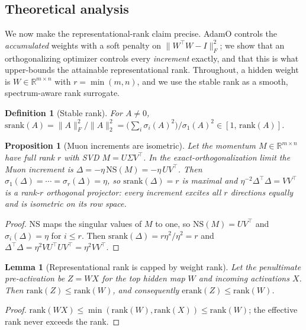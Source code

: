 \documentclass[letterpaper]{article} %
\newtheorem{proposition}{Proposition}
\newtheorem{lemma}{Lemma}
\newtheorem{definition}{Definition}
\begin{document}
\subsection{Theoretical analysis}\label{sec:theory}
We now make the representational-rank claim precise. AdamO controls the \emph{accumulated} weights with a soft penalty on $\|W^\top W-I\|_F^2$; we show that an orthogonalizing optimizer controls every \emph{increment} exactly, and that this is what upper-bounds the attainable representational rank. Throughout, a hidden weight is $W\in\mathbb{R}^{m\times n}$ with $r=\min(m,n)$, and we use the stable rank as a smooth, spectrum-aware rank surrogate.

\begin{definition}[Stable rank]
For $A\neq 0$, $\mathrm{srank}(A)=\|A\|_F^2/\|A\|_2^2=\big(\sum_i\sigma_i(A)^2\big)/\sigma_1(A)^2\in[1,\,\mathrm{rank}(A)]$.
\end{definition}

\begin{proposition}[Muon increments are isometric]\label{prop:iso}
Let the momentum $M\in\mathbb{R}^{m\times n}$ have full rank $r$ with SVD $M=U\Sigma V^\top$. In the exact-orthogonalization limit the Muon increment is $\Delta=-\eta\,\mathrm{NS}(M)=-\eta\,UV^\top$. Then $\sigma_1(\Delta)=\cdots=\sigma_r(\Delta)=\eta$, so $\mathrm{srank}(\Delta)=r$ is maximal and $\eta^{-2}\Delta^\top\Delta=VV^\top$ is a rank-$r$ orthogonal projector: every increment excites all $r$ directions equally and is isometric on its row space.
\end{proposition}
\begin{proof}
$\mathrm{NS}$ maps the singular values of $M$ to one, so $\mathrm{NS}(M)=UV^\top$ and $\sigma_i(\Delta)=\eta$ for $i\le r$. Then $\mathrm{srank}(\Delta)=r\eta^2/\eta^2=r$ and $\Delta^\top\Delta=\eta^2 V U^\top U V^\top=\eta^2 VV^\top$.
\end{proof}

\begin{lemma}[Representational rank is capped by weight rank]\label{lem:cap}
Let the penultimate pre-activation be $Z=WX$ for the top hidden map $W$ and incoming activations $X$. Then $\mathrm{rank}(Z)\le\mathrm{rank}(W)$, and consequently $\mathrm{erank}(Z)\le\mathrm{rank}(W)$.
\end{lemma}
\begin{proof}
$\mathrm{rank}(WX)\le\min(\mathrm{rank}(W),\mathrm{rank}(X))\le\mathrm{rank}(W)$; the effective rank never exceeds the rank.
\end{proof}
\end{document}
